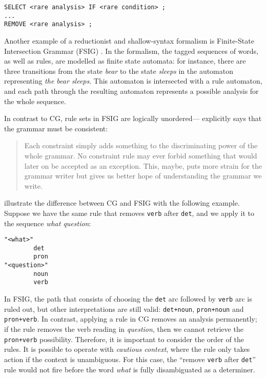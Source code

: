 \begin{verbatim}
SELECT <rare analysis> IF <rare condition> ;
...
REMOVE <rare analysis> ;
\end{verbatim}

Another example of a reductionist and shallow-syntax formalism is
Finite-State Intersection Grammar (FSIG) \citep{koskenniemi90}. In the
formalism, the tagged sequences of words, as well as rules, are modelled
as finite state automata: for instance, there are three transitions from
the state \emph{bear} to the state \emph{sleeps} in the automaton
representing \emph{the bear sleeps}. This automaton is intersected with
a rule automaton, and each path through the resulting automaton
represents a possible analysis for the whole sequence.

In contrast to CG, rule sets in FSIG are logically
unordered---\cite{koskenniemi90} explicitly says that the grammar must be
consistent:

\begin{quote}
Each constraint simply adds something to the discriminating power of the
whole grammar. No constraint rule may ever forbid something that would
later on be accepted as an exception. This, maybe, puts more strain for
the grammar writer but gives us better hope of understanding the grammar
we write.
\end{quote}

\cite{lager_nivre01} illustrate the difference between CG and FSIG with
the following example. Suppose we have the same rule that removes \texttt{verb}
after \texttt{det}, and we apply it to the sequence \emph{what
question}:


\begin{verbatim}
"<what>"
        det
        pron
"<question>"
        noun
        verb
\end{verbatim}


In FSIG, the path that consists of choosing the \texttt{det} arc
followed by \texttt{verb} arc is ruled out, but other interpretations
are still valid: \texttt{det+noun}, \texttt{pron+noun} and
\texttt{pron+verb}. In contrast, applying a rule in CG removes an
analysis permanently; if the rule removes the verb reading in
\emph{question}, then we cannot retrieve the \texttt{pron+verb}
possibility. Therefore, it is important to consider the order of the
rules. It is possible to operate with \emph{cautious context}, where the
rule only takes action if the context is unambiguous. For this case, the
``remove \texttt{verb} after \texttt{det}'' rule would not fire before
the word \emph{what} is fully disambiguated as a determiner.

